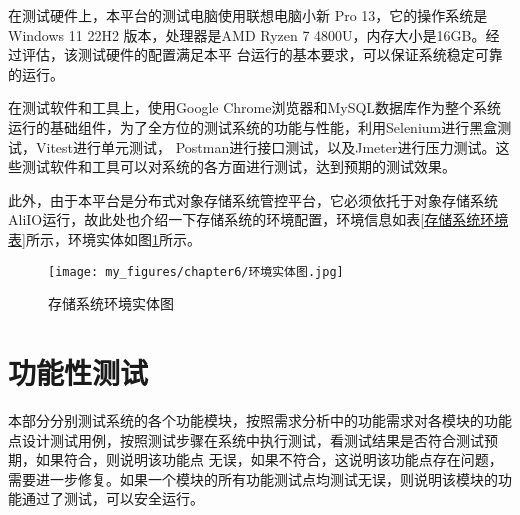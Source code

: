 在测试硬件上，本平台的测试电脑使用联想电脑小新 Pro 13，它的操作系统是Windows 11 22H2 版本，处理器是AMD Ryzen 7 4800U，内存大小是16GB。经过评估，该测试硬件的配置满足本平
台运行的基本要求，可以保证系统稳定可靠的运行。

在测试软件和工具上，使用Google Chrome浏览器和MySQL数据库作为整个系统运行的基础组件，为了全方位的测试系统的功能与性能，利用Selenium进行黑盒测试\cite{kng222eji}，Vitest进行单元测试\cite{kng2562eji}，
Postman进行接口测试，以及Jmeter进行压力测试\cite{kng232eji}。这些测试软件和工具可以对系统的各方面进行测试，达到预期的测试效果。

此外，由于本平台是分布式对象存储系统管控平台，它必须依托于对象存储系统AliIO运行，故此处也介绍一下存储系统的环境配置，环境信息如表\ref{存储系统环境表}所示，环境实体如图\ref{fig:存储系统环境实体图}所示。

\begin{center}
    \renewcommand\arraystretch{1.5}{
    }
    \vspace{-1cm}
\end{center}


\begin{figure}[htb]
    \centering
    \texttt{[image: my\_figures/chapter6/环境实体图.jpg]}
    \caption{存储系统环境实体图}
    \label{fig:存储系统环境实体图}
\end{figure}


\section{功能性测试}

本部分分别测试系统的各个功能模块，按照需求分析中的功能需求对各模块的功能点设计测试用例，按照测试步骤在系统中执行测试，看测试结果是否符合测试预期，如果符合，则说明该功能点
无误，如果不符合，这说明该功能点存在问题，需要进一步修复。如果一个模块的所有功能测试点均测试无误，则说明该模块的功能通过了测试，可以安全运行。


